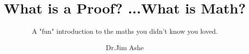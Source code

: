 \documentclass[english,t,aspectratio=169,xcolor=table,usenames,dvipsnames]{beamer} %
\title[What is a Proof? ...What is Math?]{What is a Proof? ...What is Math?}
\subtitle{A "fun" introduction to the maths you didn't know you loved.}
\author{Dr.\. Jim Ashe}
\institute{IT College \\Mathematics, Computer Science, Data Analytics, \textbf{Capstone}}
\begin{document}
\makebeamertitle 
\nonfrenchspacing %
% 




% 
\end{document}
